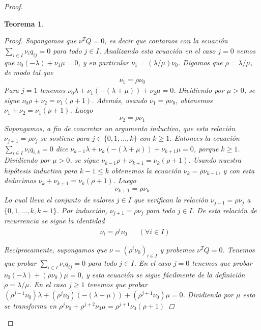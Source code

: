 \documentclass{article}
\newtheorem{theorem}{Teorema}
\theoremstyle{definition}
\begin{document}
\begin{proof}
\begin{theorem}
\begin{proof}
Supongamos que \(\nu^T Q = 0\), es decir que contamos con la ecuación \(\sum_{i \in I} \nu_i q_{i j} = 0\) para todo \(j \in I\).
Analizando esta ecuación en el caso \(j = 0\) vemos que \(\nu_0 (- \lambda) + \nu_1 \mu = 0\), y en particular \(\nu_1 = (\lambda / \mu) \nu_0\).
Digamos que \(\rho = \lambda / \mu\), de modo tal que 
\begin{align}
	\nu_1 = \rho \nu_0
\end{align}
Para \(j = 1\) tenemos \(\nu_0 \lambda + \nu_1 (- (\lambda + \mu)) + \nu_2 \mu = 0\).
Dividiendo por \(\mu > 0\), se sigue \(\nu_0 \rho + \nu_2 = \nu_1 (\rho + 1)\).
Además, usando \(\nu_1 = \rho \nu_0\), obtenemos \(\nu_1 + \nu_2 = \nu_1 (\rho + 1)\).
Luego 
\begin{align}
	\nu_2 = \rho \nu_1
\end{align}
Supongamos, a fin de concretar un argumento inductivo, que esta relación \(\nu_{j + 1} = \rho \nu_j\) se sostiene para \(j \in \{0, 1, \dots, k\}\) con \(k \geq 1\).
Entonces la ecuación \(\sum_{i \in I} \nu_i q_{i, k} = 0\) dice \(\nu_{k - 1} \lambda + \nu_k (- (\lambda + \mu)) + \nu_{k + 1} \mu = 0\), porque \(k \geq 1\).
Dividiendo por \(\mu > 0\), se sigue \(\nu_{k - 1} \rho + \nu_{k + 1} = \nu_k (\rho + 1)\).
Usando nuestra hipótesis inductiva para \(k - 1 \leq k\) obtenemos la ecuación \(\nu_k = \rho \nu_{k - 1}\), y con esta deducimos \(\nu_k + \nu_{k + 1} = \nu_k (\rho + 1)\).
Luego
\begin{align}
	\nu_{k + 1} = \rho \nu_k
\end{align}
Lo cual lleva el conjunto de valores \(j \in I\) que verifican la relación \(\nu_{j + 1} = \rho \nu_j\) a \(\{0, 1, \dots, k, k + 1\}\).
Por inducción, \(\nu_{j + 1} = \rho \nu_j\) para todo \(j \in I\).
De esta relación de recurrencia se sigue la identidad 
\begin{align}
	&\nu_i = \rho^i \nu_0 &&(\forall i \in I)
\end{align}

Recíprocamente, supongamos que \(\nu = (\rho^i \nu_0)_{i \in I}\) y probemos \(\nu^T Q = 0\).
Tenemos que probar \(\sum_{i \in I} \nu_i q_{i j} = 0\) para todo \(j \in I\).
En el caso \(j = 0\) tenemos que probar \(\nu_0 (- \lambda) + (\rho \nu_0) \mu = 0\), y esta ecuación se sigue fácilmente de la definición \(\rho = \lambda / \mu\).
En el caso \(j \geq 1\) tenemos que probar \((\rho^{j - 1} \nu_0) \lambda + (\rho^j \nu_0) (- (\lambda + \mu)) + (\rho^{j + 1} \nu_0) \mu = 0\).
Dividiendo por \(\mu\) esto se transforma en \(\rho^j \nu_0 + \rho^{j + 2} \nu_0 \mu = \rho^{j + 1} \nu_0 (\rho + 1)\)




\end{proof}
\end{theorem}
\end{proof}
\end{document}
